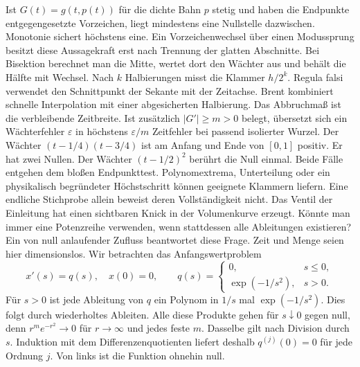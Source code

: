 \hypertarget{punkt5-2-1}{}
Ist \(G(t)=g(t,p(t))\) für die dichte Bahn \(p\) stetig und haben die Endpunkte entgegengesetzte Vorzeichen, liegt mindestens eine Nullstelle dazwischen. Monotonie sichert höchstens eine. Ein Vorzeichenwechsel über einen Modussprung besitzt diese Aussagekraft erst nach Trennung der glatten Abschnitte.
\hypertarget{punkt5-2-2}{}
Bei Bisektion berechnet man die Mitte, wertet dort den Wächter aus und behält die Hälfte mit Wechsel. Nach \(k\) Halbierungen misst die Klammer \(h/2^k\). Regula falsi verwendet den Schnittpunkt der Sekante mit der Zeitachse. Brent kombiniert schnelle Interpolation mit einer abgesicherten Halbierung. Das Abbruchmaß ist die verbleibende Zeitbreite. Ist zusätzlich \(|G'|\ge m>0\) belegt, übersetzt sich ein Wächterfehler \(\varepsilon\) in höchstens \(\varepsilon/m\) Zeitfehler bei passend isolierter Wurzel.
\hypertarget{punkt5-2-3}{}
Der Wächter \((t-1/4)(t-3/4)\) ist am Anfang und Ende von \([0,1]\) positiv. Er hat zwei Nullen. Der Wächter \((t-1/2)^2\) berührt die Null einmal. Beide Fälle entgehen dem bloßen Endpunkttest. Polynomextrema, Unterteilung oder ein physikalisch begründeter Höchstschritt können geeignete Klammern liefern. Eine endliche Stichprobe allein beweist deren Vollständigkeit nicht.
Das Ventil der Einleitung hat einen sichtbaren Knick in der Volumenkurve erzeugt. Könnte man immer eine Potenzreihe verwenden, wenn stattdessen alle Ableitungen existieren? Ein von null anlaufender Zufluss beantwortet diese Frage. Zeit und Menge seien hier dimensionslos. Wir betrachten das Anfangswertproblem
\[
 x'(s)=q(s),\quad x(0)=0,\qquad
 q(s)=
 \begin{cases}
 0,&s\le0,\\
 \exp(-1/s^2),&s>0 .
 \end{cases}
\]
Für \(s>0\) ist jede Ableitung von \(q\) ein Polynom in \(1/s\) mal \(\exp(-1/s^2)\). Dies folgt durch wiederholtes Ableiten. Alle diese Produkte gehen für \(s\downarrow0\) gegen null, denn \(r^m e^{-r^2}\to0\) für \(r\to\infty\) und jedes feste \(m\). Dasselbe gilt nach Division durch \(s\). Induktion mit dem Differenzenquotienten liefert deshalb \(q^{(j)}(0)=0\) für jede Ordnung \(j\). Von links ist die Funktion ohnehin null.
